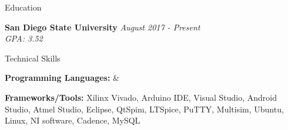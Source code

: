 \documentclass{resume} %
\begin{document}

\begin{rSection}{Education}

{\bf San Diego State University } \hfill {\em August 2017 - Present} 
\\{ } \hfill {\em GPA: 3.52} 
\\{ }

\end{rSection}

\begin{rSection}{Technical Skills}

\textbf {Programming Languages:} & 

\textbf{Frameworks/Tools:} Xilinx Vivado, Arduino IDE, Visual Studio, Android Studio, Atmel Studio, Eclipse, QtSpim, LTSpice, PuTTY, Multisim, Ubuntu, Linux, NI software, Cadence, MySQL


\end{rSection}
\end{document}

